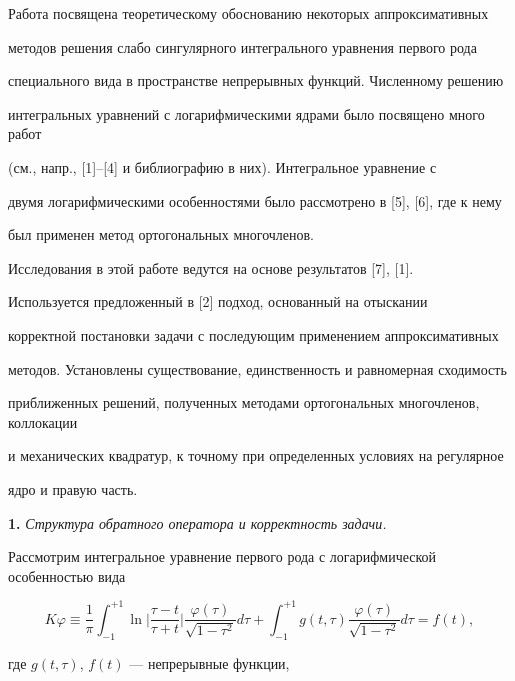 Работа посвящена теоретическому обоснованию некоторых аппроксимативных


методов решения слабо сингулярного интегрального уравнения первого рода


специального вида в пространстве непрерывных функций. Численному решению


интегральных уравнений с логарифмическими ядрами было посвящено много работ


(см., напр., [1]--[4] и библиографию в них). Интегральное уравнение с


двумя логарифмическими особенностями было рассмотрено в [5], [6], где к нему


был применен метод ортогональных многочленов.





Исследования в этой работе ведутся на основе результатов [7], [1].


Используется предложенный в [2] подход, основанный на отыскании 


корректной постановки задачи с последующим применением аппроксимативных


методов. Установлены существование, единственность и равномерная сходимость


приближенных решений, полученных методами ортогональных многочленов, коллокации


и механических квадратур, к точному при определенных условиях на регулярное


ядро и правую часть.


\medskip





{\bf 1.} {\it Структура обратного оператора и корректность задачи.}


Рассмотрим интегральное уравнение первого рода с логарифмической особенностью вида


\begin{equation}


K\varphi \equiv \frac{1}{\pi}\int^{+1}_{-1}


\ln\bigg|\frac{\tau - t}{\tau+t}\bigg|


\frac{\varphi(\tau)}{\sqrt{1-\tau^2}}d\tau


+\int^{+1}_{-1}g(t,\tau)\frac{\varphi(\tau)}{\sqrt{1-\tau^2}}d\tau = f(t),


\end{equation}


где $g(t,\tau)$, $f(t)$ --- непрерывные функции,


